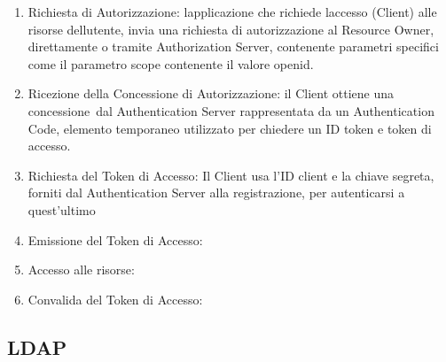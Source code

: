 \documentclass[
]{article}
\providecommand{\tightlist}{%
  \setlength{\itemsep}{0pt}\setlength{\parskip}{0pt}}
\begin{document}
\begin{enumerate}
\tightlist
\item
  {Richiesta di Autorizzazione}{: l\textquotesingle applicazione che
  richiede l\textquotesingle accesso (Client) alle risorse
  dell\textquotesingle utente, invia una richiesta di autorizzazione al
  Resource Owner, direttamente o tramite Authorization Server,
  contenente parametri specifici come il parametro scope contenente il
  valore openid.}
\end{enumerate}

{}

\begin{enumerate}
\setcounter{enumi}{1}
\tightlist
\item
  {Ricezione della Concessione di Autorizzazione}{: il Client ottiene
  }{una concessione}{~dal Authentication Server rappresentata da un
  Authentication Code, elemento temporaneo utilizzato per chiedere un ID
  token e token di accesso.}
\end{enumerate}

{}

\begin{enumerate}
\setcounter{enumi}{2}
\tightlist
\item
  {Richiesta del Token di Accesso}{: Il Client usa l'ID client e la
  chiave segreta, forniti dal Authentication Server alla registrazione,
  per autenticarsi a quest'ultimo}
\end{enumerate}

{}

\begin{enumerate}
\setcounter{enumi}{3}
\tightlist
\item
  {Emissione del Token di Accesso}{:}
\end{enumerate}

{}

\begin{enumerate}
\setcounter{enumi}{4}
\tightlist
\item
  {Accesso alle risorse}{:}
\end{enumerate}

{}

\begin{enumerate}
\setcounter{enumi}{5}
\tightlist
\item
  {Convalida del Token di Accesso}{:}
\end{enumerate}

\subsection{\texorpdfstring{{LDAP}}{LDAP}}\label{h.x7bqb0t8ig1a}
\end{document}

